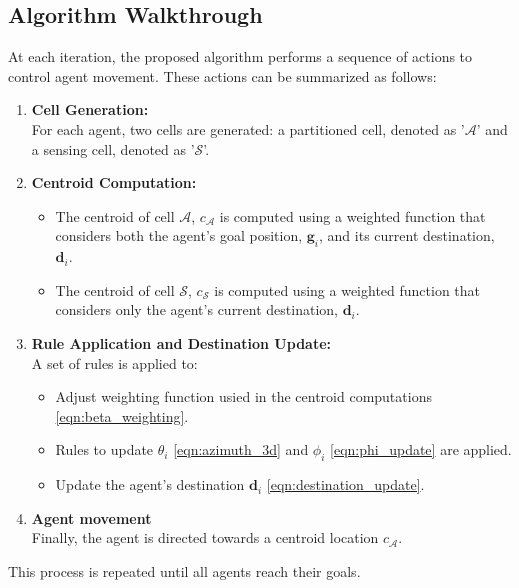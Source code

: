     \subsection{Algorithm Walkthrough}
        At each iteration, the proposed algorithm performs a sequence of actions to control agent movement. 
        These actions can be summarized as follows:
        \begin{enumerate}
            \item \textbf{Cell Generation:} \\
                For each agent, two cells are generated: a partitioned cell, denoted as '$\mathcal{A}$' and a sensing cell, denoted as '$\mathcal{S}$'.
            \item \textbf{Centroid Computation:}
                \begin{itemize}
                    \item The centroid of cell $\mathcal{A}$, $c_{\mathcal{A}}$ is computed using a weighted function that considers both the agent's goal position, $\mathbf{g}_i$, and its current destination, $\mathbf{d}_i$.
                    \item The centroid of cell $\mathcal{S}$, $c_{\mathcal{S}}$ is computed using a weighted function that considers only the agent's current destination, $\mathbf{d}_i$.
                \end{itemize}
            \item \textbf{Rule Application and Destination Update:} \\
                A set of rules is applied to: 
                \begin{itemize}
                    \item Adjust weighting function usied in the centroid computations \eqref{eqn:beta_weighting}.
                    \item Rules to update $\theta_i$ \eqref{eqn:azimuth_3d} and $\phi_i$ \eqref{eqn:phi_update} are applied.
                    \item Update the agent's destination $\mathbf{d}_i$ \eqref{eqn:destination_update}.
                \end{itemize}
            \item \textbf{Agent movement} \\
                Finally, the agent is directed towards a centroid location $c_{\mathcal{A}}$.
        \end{enumerate}
        This process is repeated until all agents reach their goals.

